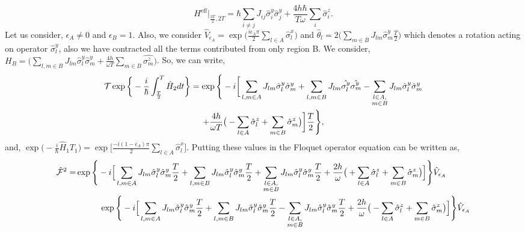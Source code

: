 \documentclass[%
nofootinbib,
reprint,
superscriptaddress,
amsmath,amssymb,showkeys,
aps,
prb,
]{revtex4-2}
\begin{document}
	\begin{equation}
		H^{\mathrm{eff}}\vert_{\frac{3T}{2}, 2T} = \hbar\sum_{i\neq j} J_{ij} \hat{\sigma}^y_i \hat{\sigma}^y_{j} + \frac{4h\hbar}{T \omega}\sum_i\hat{\sigma}^z_i.
	\end{equation} 
	Let us consider, $\epsilon_A \neq 0$ and $\epsilon_B=1$. Also, we consider $\displaystyle \hat{V}_{\epsilon_A} = \exp\Big(\frac{i\epsilon_A \pi}{2}\sum_{l\in A}\hat{\sigma}^x_l\Big)$  and $\displaystyle \hat{\theta}_l = 2 \Big(\sum_{m \in B}J_{lm}\hat{\sigma}^y_m \frac{T}{2} \Big)$ which denotes a rotation acting on operator $\hat{\sigma}^y_l$, also we have contracted all the terms contributed from only region B. We consider, $\displaystyle {H}_B = \Big(\sum_{l,m\in B} J_{lm} \hat{\sigma}^y_l\hat{\sigma}^y_m + \frac{4h}{\omega T}\sum_{m \in B}\hat{\sigma^z_m}\Big)$. So, we can write,		
	\begin{multline}
		\mathcal{T}\exp\bigg\{-\frac{i}{\hbar}\int_{\frac{T}{2}}^{T} \hat{H}_2 dt\bigg\} = \exp\Bigg\{-i \bigg[ \sum_{l,m\in A}J_{lm} \hat{\sigma}_l^y\hat{\sigma}_m^y +\sum_{l,m\in B}J_{lm}
		\hat{\sigma_l^y}\hat{\sigma_m^y}-\sum_{\substack{%
				l \in A,\\
				m \in B\hfill}} J_{lm}\hat{\sigma}^y_l\hat{\sigma}^y_m\\+\frac{4h}{\omega T}\big( -\sum_{l\in A}^{}\hat{\sigma}^z_l + \sum_{m\in B}^{}\hat{\sigma}^z_m\big)\bigg]\frac{T}{2}\Bigg\},
	\end{multline}	
	and, $\displaystyle 
	\exp\Big(-\frac{i}{\hbar} \hat{H}_1 T_1\Big) = \exp\Bigg[\frac{-i(1-\epsilon_A)\pi}{2}\sum_{l \in A}\hat{\sigma}^x_l\Bigg].$
	Putting these values in the Floquet operator equation can be written as,    	
	\begin{align}
		\hat{\mathcal{F}}^2 
		=& \exp\Bigg\{-i \Big[ \sum_{l,m\in A}J_{lm} \hat{\sigma}^y_l\hat{\sigma}^y_m\frac{T}{2} +\sum_{l,m\in B}J_{lm} \hat{\sigma}^y_l\hat{\sigma}^y_m\frac{T}{2}+\sum_{\substack{%
				l \in A,\\
				m \in B\hfill}} J_{lm}\hat{\sigma}^y_l\hat{\sigma}^y_m\frac{T}{2} +\frac{2h}{\omega }\big( +\sum_{l\in A}^{}\hat{\sigma}^z_l + \sum_{m\in B}^{}\hat{\sigma}^z_m\big)\Big]\Bigg\} \hat{V}_{\epsilon_A} \nonumber\\
		& \hspace{1 cm}\exp\Bigg\{-i \Big[ \sum_{l,m\in A}J_{lm} \hat{\sigma}^y_l\hat{\sigma}^y_m\frac{T}{2} +\sum_{l,m\in B}J_{lm} \hat{\sigma}^y_l\hat{\sigma}^y_m\frac{T}{2}-\sum_{\substack{%
				l \in A,\\
				m \in B\hfill}} J_{lm}\hat{\sigma}^y_l\hat{\sigma}^y_m\frac{T}{2} +\frac{2h}{\omega}\big( -\sum_{l\in A}^{}\hat{\sigma}^z_l + \sum_{m\in B}^{}\hat{\sigma}^z_m\big)\Big]\Bigg\} \hat{V}_{\epsilon_A}\nonumber
		\end{align}
\end{document}
